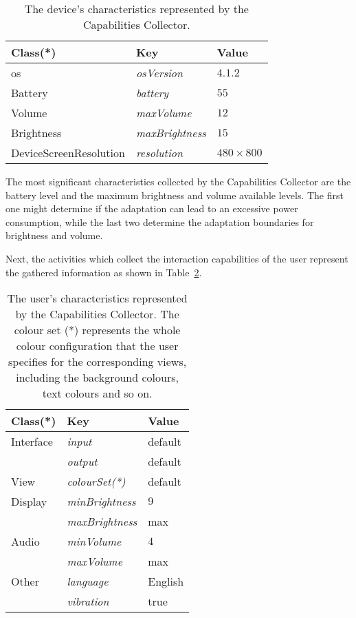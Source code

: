 \begin{table}
 \caption{The device's characteristics represented by the Capabilities Collector.}
 \label{tbl:device}
 \footnotesize
 \centering
\begin{tabular}{l l l}
  \hline 
  \textbf{Class(*)}& \textbf{Key} & \textbf{Value}		\\
  \hline
  \ac{os}	& \textit{osVersion}		& $4.1.2$	\\
  Battery	& \textit{battery}		& $55$		\\
  Volume	& \textit{maxVolume}		& $12$		\\
  Brightness	& \textit{maxBrightness}	& $15$		\\
  DeviceScreenResolution & \textit{resolution}	& $480×800$	\\	
  \hline
\end{tabular}
\end{table}

The most significant characteristics collected by the Capabilities Collector
are the battery level and the maximum brightness and volume available levels.
The first one might determine if the adaptation can lead to an excessive power
consumption, while the last two determine the adaptation boundaries for 
brightness and volume.

Next, the activities which collect the interaction capabilities of the user
represent the gathered information as shown in Table~\ref{tbl:user}.

\begin{table}
 \caption{The user's characteristics represented by the Capabilities Collector.
 The colour set (*) represents the whole colour configuration that the user 
 specifies for the corresponding views, including the background colours, text 
 colours and so on.}
 \label{tbl:user}
 \footnotesize
 \centering
\begin{tabular}{l l l}
  \hline 
  \textbf{Class(*)}& \textbf{Key} & \textbf{Value}		\\
  \hline
  Interface 	& \textit{input}		& default	\\
		& \textit{output} 		& default	\\
  View		& \textit{colourSet(*)}		& default	\\
  Display 	& \textit{minBrightness}	& $9$		\\ 
 		& \textit{maxBrightness}	& max		\\
  Audio 	& \textit{minVolume}		& $4$		\\
 		& \textit{maxVolume} 		& max		\\
  Other 	& \textit{language}		& English	\\
 		& \textit{vibration} 		& true 		\\	
  \hline
\end{tabular}
\end{table}

